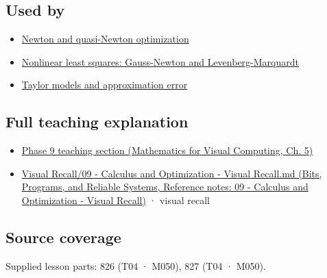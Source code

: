 \subsection{Used by}\label{appendix-6ac071f8b50c-used-by}

\begin{itemize}
\tightlist
\item
  \hyperref[appendix-54c8f5828387]{Newton and quasi-Newton optimization}
\item
  \hyperref[appendix-2c2df8345991]{Nonlinear least squares: Gauss-Newton and Levenberg-Marquardt}
\item
  \hyperref[appendix-32f39e9a3738]{Taylor models and approximation error}
\end{itemize}

\subsection{Full teaching explanation}\label{appendix-6ac071f8b50c-full-teaching-explanation}

\begin{itemize}
\tightlist
\item
  \href{../02-Mathematics-for-Visual-Computing/main.pdf\#nameddest=02-foundations-ii-ch021-jacobians-curvature-and-local-approximation}{Phase 9 teaching section (Mathematics for Visual Computing, Ch. 5)}
\item
  \href{../01-Bits-Programs-and-Reliable-Systems/main.pdf\#nameddest=appendix-adf48f5dc5c1}{Visual Recall/09 - Calculus and Optimization - Visual Recall.md (Bits, Programs, and Reliable Systems, Reference notes: 09 - Calculus and Optimization - Visual Recall)} · visual recall
\end{itemize}

\subsection{Source coverage}\label{appendix-6ac071f8b50c-source-coverage}

Supplied lesson parts: 826 (T04 · M050), 827 (T04 · M050).
